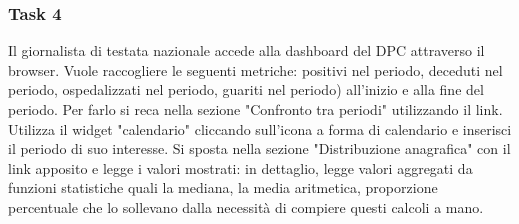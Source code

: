 \subsubsection{Task 4}
\label{sss:cw-task-4}

Il giornalista di testata nazionale accede alla dashboard del DPC attraverso il browser.
Vuole raccogliere le seguenti metriche: positivi nel periodo, deceduti nel periodo, ospedalizzati nel periodo, guariti nel periodo) all'inizio e alla fine del periodo. 
Per farlo si reca nella sezione "Confronto tra periodi" utilizzando il link.
Utilizza il widget "calendario" cliccando sull'icona a forma di calendario e inserisci il periodo di suo interesse.
Si sposta nella sezione "Distribuzione anagrafica" con il link apposito e legge i valori mostrati: in dettaglio, legge valori aggregati da funzioni statistiche quali la mediana, la media aritmetica, proporzione percentuale che lo sollevano dalla necessità di compiere questi calcoli a mano.